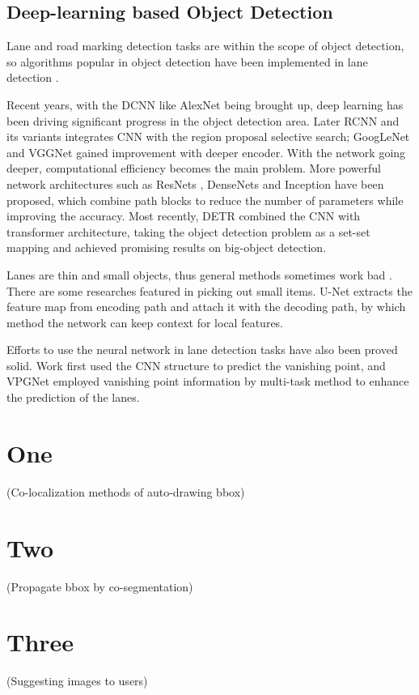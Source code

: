 \begin{spacing}{1.5}
\subsection{Deep-learning based Object Detection}

Lane and road marking detection tasks are within the scope of object detection, so algorithms popular in object detection have been implemented in lane detection \cite{tang2020review}. 

Recent years, with the DCNN like AlexNet \cite{krizhevsky2012imagenet} being brought up, deep learning has been driving significant progress in the object detection area. Later RCNN and its variants \cite{girshick2014rich, girshick2015fast, ren2015faster} integrates CNN with the region proposal selective search; GoogLeNet \cite{szegedy2015going} and VGGNet \cite{simonyan2014very} gained improvement with deeper encoder. With the network going deeper, computational efficiency becomes the main problem. More powerful network architectures such as ResNets \cite{he2016deep}, DenseNets \cite{huang2017densely} and Inception \cite{ioffe2015batch} have been proposed, which combine path blocks to reduce the number of parameters while improving the accuracy. Most recently, DETR \cite{carion2020end} combined the CNN with transformer architecture, taking the object detection problem as a set-set mapping and achieved promising results on big-object detection.

Lanes are thin and small objects, thus general methods sometimes work bad \cite{tang2020review}. There are some researches featured in picking out small items. U-Net \cite{ronneberger2015unet} extracts the feature map from encoding path and attach it with the decoding path, by which method the network can keep context for local features.

Efforts to use the neural network in lane detection tasks have also been proved solid. Work \cite{borji2016vanishing} first used the CNN structure to predict the vanishing point, and VPGNet \cite{lee2017vpgnet} employed vanishing point information by multi-task method to enhance the prediction of the lanes.

\section{One}
(Co-localization methods of auto-drawing bbox)

\section{Two}
(Propagate bbox by co-segmentation)

\section{Three}
(Suggesting images to users)


\end{spacing}
\newpage
